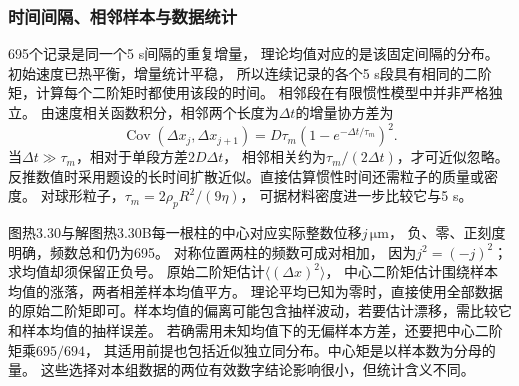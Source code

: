 \documentclass[UTF8,fontset=fandol,a4paper,11pt]{ctexart}
\begin{document}
\subsubsection*{时间间隔、相邻样本与数据统计}
695个记录是同一个5 s间隔的重复增量，
理论均值对应的是该固定间隔的分布。
初始速度已热平衡，增量统计平稳，
所以连续记录的各个5 s段具有相同的二阶矩，计算每个二阶矩时都使用该段的时间。
相邻段在有限惯性模型中并非严格独立。
由速度相关函数积分，相邻两个长度为$\Delta t$的增量协方差为
\[
\operatorname{Cov}(\Delta x_j,\Delta x_{j+1})
=D\tau_m(1-e^{-\Delta t/\tau_m})^2.
\]
当$\Delta t\gg\tau_m$，相对于单段方差$2D\Delta t$，
相邻相关约为$\tau_m/(2\Delta t)$，才可近似忽略。
反推数值时采用题设的长时间扩散近似。直接估算惯性时间还需粒子的质量或密度。
对球形粒子，$\tau_m=2\rho_pR^2/(9\eta)$，
可据材料密度进一步比较它与5 s。

图热3.30与解图热3.30B每一根柱的中心对应实际整数位移$j\,\mathrm{\mu m}$，
负、零、正刻度明确，频数总和仍为695。
对称位置两柱的频数可成对相加，
因为$j^2=(-j)^2$；求均值却须保留正负号。
原始二阶矩估计$\langle(\Delta x)^2\rangle$，
中心二阶矩估计围绕样本均值的涨落，两者相差样本均值平方。
理论平均已知为零时，直接使用全部数据的原始二阶矩即可。样本均值的偏离可能包含抽样波动，若要估计漂移，需比较它和样本均值的抽样误差。
若确需用未知均值下的无偏样本方差，还要把中心二阶矩乘$695/694$，
其适用前提也包括近似独立同分布。中心矩是以样本数为分母的量。
这些选择对本组数据的两位有效数字结论影响很小，但统计含义不同。
\end{document}
